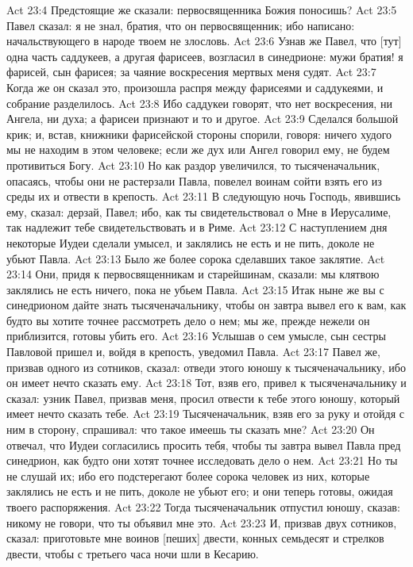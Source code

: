 Act 23:4  Предстоящие же сказали: первосвященника Божия поносишь?
Act 23:5  Павел сказал: я не знал, братия, что он первосвященник; ибо написано: начальствующего в народе твоем не злословь.
Act 23:6  Узнав же Павел, что [тут] одна часть саддукеев, а другая фарисеев, возгласил в синедрионе: мужи братия! я фарисей, сын фарисея; за чаяние воскресения мертвых меня судят.
Act 23:7  Когда же он сказал это, произошла распря между фарисеями и саддукеями, и собрание разделилось.
Act 23:8  Ибо саддукеи говорят, что нет воскресения, ни Ангела, ни духа; а фарисеи признают и то и другое.
Act 23:9  Сделался большой крик; и, встав, книжники фарисейской стороны спорили, говоря: ничего худого мы не находим в этом человеке; если же дух или Ангел говорил ему, не будем противиться Богу.
Act 23:10  Но как раздор увеличился, то тысяченачальник, опасаясь, чтобы они не растерзали Павла, повелел воинам сойти взять его из среды их и отвести в крепость.
Act 23:11  В следующую ночь Господь, явившись ему, сказал: дерзай, Павел; ибо, как ты свидетельствовал о Мне в Иерусалиме, так надлежит тебе свидетельствовать и в Риме.
Act 23:12  С наступлением дня некоторые Иудеи сделали умысел, и заклялись не есть и не пить, доколе не убьют Павла.
Act 23:13  Было же более сорока сделавших такое заклятие.
Act 23:14  Они, придя к первосвященникам и старейшинам, сказали: мы клятвою заклялись не есть ничего, пока не убьем Павла.
Act 23:15  Итак ныне же вы с синедрионом дайте знать тысяченачальнику, чтобы он завтра вывел его к вам, как будто вы хотите точнее рассмотреть дело о нем; мы же, прежде нежели он приблизится, готовы убить его.
Act 23:16  Услышав о сем умысле, сын сестры Павловой пришел и, войдя в крепость, уведомил Павла.
Act 23:17  Павел же, призвав одного из сотников, сказал: отведи этого юношу к тысяченачальнику, ибо он имеет нечто сказать ему.
Act 23:18  Тот, взяв его, привел к тысяченачальнику и сказал: узник Павел, призвав меня, просил отвести к тебе этого юношу, который имеет нечто сказать тебе.
Act 23:19  Тысяченачальник, взяв его за руку и отойдя с ним в сторону, спрашивал: что такое имеешь ты сказать мне?
Act 23:20  Он отвечал, что Иудеи согласились просить тебя, чтобы ты завтра вывел Павла пред синедрион, как будто они хотят точнее исследовать дело о нем.
Act 23:21  Но ты не слушай их; ибо его подстерегают более сорока человек из них, которые заклялись не есть и не пить, доколе не убьют его; и они теперь готовы, ожидая твоего распоряжения.
Act 23:22  Тогда тысяченачальник отпустил юношу, сказав: никому не говори, что ты объявил мне это.
Act 23:23  И, призвав двух сотников, сказал: приготовьте мне воинов [пеших] двести, конных семьдесят и стрелков двести, чтобы с третьего часа ночи шли в Кесарию.
